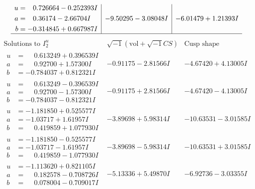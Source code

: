 \documentclass[1p]{elsarticle_modified}
\theoremstyle{definition}
\newcommand{\I}{\sqrt{-1}}
\begin{document}
$$\begin{array}{c|c|c}
\begin{aligned}
u &= \phantom{-}0.726664 - 0.252393 I \\
a &= \phantom{-}0.36174 - 2.66704 I \\
b &= -0.314845 + 0.667987 I\end{aligned}
 & -9.50295 - 3.08048 I & -6.01479 + 1.21393 I\\
 \hline 
 \end{array}$$\newpage$$\begin{array}{c|c|c}  
\text{Solutions to }I^u_{2}& \I (\text{vol} + \sqrt{-1}CS) & \text{Cusp shape}\\
 \hline 
\begin{aligned}
u &= \phantom{-}0.613249 + 0.396539 I \\
a &= \phantom{-}0.92700 + 1.57300 I \\
b &= -0.784037 + 0.812321 I\end{aligned}
 & -0.91175 - 2.81566 I & -4.67420 + 4.13005 I \\ \hline\begin{aligned}
u &= \phantom{-}0.613249 - 0.396539 I \\
a &= \phantom{-}0.92700 - 1.57300 I \\
b &= -0.784037 - 0.812321 I\end{aligned}
 & -0.91175 + 2.81566 I & -4.67420 - 4.13005 I \\ \hline\begin{aligned}
u &= -1.181850 + 0.525577 I \\
a &= -1.03717 + 1.61957 I \\
b &= \phantom{-}0.419859 + 1.077930 I\end{aligned}
 & -3.89698 + 5.98314 I & -10.63531 - 3.01585 I \\ \hline\begin{aligned}
u &= -1.181850 - 0.525577 I \\
a &= -1.03717 - 1.61957 I \\
b &= \phantom{-}0.419859 - 1.077930 I\end{aligned}
 & -3.89698 - 5.98314 I & -10.63531 + 3.01585 I \\ \hline\begin{aligned}
u &= -1.113620 + 0.821105 I \\
a &= \phantom{-}0.182578 - 0.708726 I \\
b &= \phantom{-}0.078004 - 0.709017 I\end{aligned}
 & -5.13336 + 5.49870 I & -6.92736 - 3.03355 I \\ \hline\begin{aligned}

\end{aligned}
\end{array}$$
\end{document}
